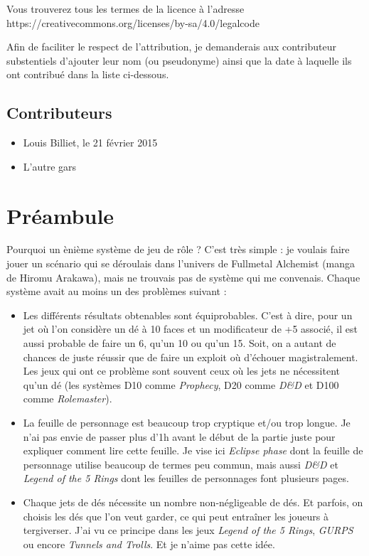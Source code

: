 \documentclass[oneside,12pt]{article}
\begin{document}
Vous trouverez tous les termes de la licence \`a l'adresse\\https://creativecommons.org/licenses/by-sa/4.0/legalcode

Afin de faciliter le respect de l'attribution, je demanderais aux contributeur substentiels d'ajouter leur nom (ou pseudonyme) ainsi que la date \`a laquelle ils ont contribu\'e dans la liste ci-dessous.

\subsection*{Contributeurs}
\begin{itemize}
  \item Louis Billiet, le 21 f\'evrier 2015
  \item L'autre gars
\end{itemize}
\thispagestyle{empty}
\newpage
\tableofcontents
\thispagestyle{empty}
\newpage
\section{Pr\'eambule}
\setcounter{page}{1}
Pourquoi un \`eni\`eme syst\`eme de jeu de r\^ole ?
C'est tr\`es simple : je voulais faire jouer un sc\'enario qui se d\'eroulais dans l'univers de Fullmetal Alchemist (manga de Hiromu Arakawa), mais ne trouvais pas de syst\`eme qui me convenais.
Chaque syst\`eme avait au moins un des probl\`emes suivant :
\begin{itemize}
\item
  Les diff\'erents r\'esultats obtenables sont \'equiprobables.
  C'est \`a dire, pour un jet o\`u l'on consid\`ere un d\'e \`a 10 faces et un modificateur de +5 associ\'e, il est aussi probable de faire un 6, qu'un 10 ou qu'un 15.
  Soit, on a autant de chances de juste r\'eussir que de faire un exploit o\`u d'\'echouer magistralement.
  Les jeux qui ont ce problème sont souvent ceux o\`u les jets ne n\'ecessitent qu'un d\'e (les syst\`emes D10 comme \textit{Prophecy}, D20 comme \textit{D\&D} et D100 comme \textit{Rolemaster}).
\item
  La feuille de personnage est beaucoup trop cryptique et/ou trop longue.
  Je n'ai pas envie de passer plus d'1h avant le d\'ebut de la partie juste pour expliquer comment lire cette feuille.
  Je vise ici \textit{Eclipse phase} dont la feuille de personnage utilise beaucoup de termes peu commun, mais aussi \textit{D\&D} et \textit{Legend of the 5 Rings} dont les feuilles de personnages font plusieurs pages.
\item
  Chaque jets de d\'es n\'ecessite un nombre non-n\'egligeable de d\'es.
  Et parfois, on choisis les d\'es que l'on veut garder, ce qui peut entra\^iner les joueurs \`a tergiverser.
  J'ai vu ce principe dans les jeux \textit{Legend of the 5 Rings}, \textit{GURPS} ou encore \textit{Tunnels and Trolls}.
  Et je n'aime pas cette id\'ee.
\end{itemize}
\end{document}
